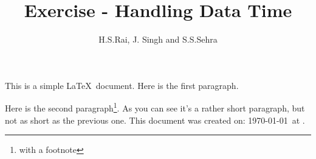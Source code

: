 \documentclass[12pt]{article}
\author{H.S.Rai, J. Singh and S.S.Sehra}
\title{Exercise - Handling Data Time}
\begin{document}
\maketitle

This is a simple \LaTeX\ document.
Here is the first paragraph.

Here is the second paragraph\footnote{with a footnote}. 
As you can see it's a rather short paragraph, but not 
as short as the previous one. This document was 
created on: \today\ at \currenttime.
\end{document}
